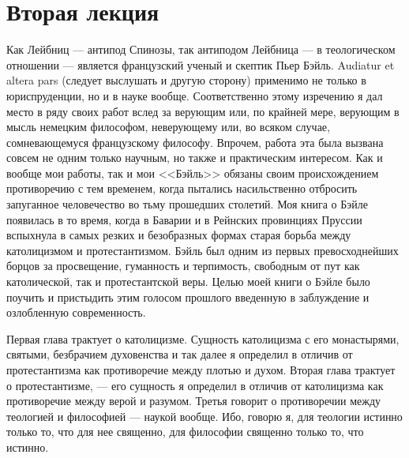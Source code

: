 \documentclass[12pt]{article}
\begin{document}
{}
\section*{Вторая лекция}

Как Лейбниц --- антипод Спинозы, так антиподом Лейбница --- в теологическом отношении --- является французский ученый и скептик Пьер Бэйль. Audiatur et altera pars (следует выслушать и другую сторону) применимо не только в юриспруденции, но и в науке вообще. Соответственно этому изречению я дал место в ряду своих работ вслед за верующим или, по крайней мере, верующим в мысль немецким философом, неверующему или, во всяком случае, сомневающемуся французскому философу. Впрочем, работа эта была вызвана совсем не одним только научным, но также и практическим интересом. Как и вообще мои работы, так и мои <<Бэйль>> обязаны своим происхождением противоречию с тем временем, когда пытались насильственно отбросить запуганное человечество во тьму прошедших столетий. Моя книга о Бэйле появилась в то время, когда в Баварии и в Рейнских провинциях Пруссии вспыхнула в самых резких и безобразных формах старая борьба между католицизмом и протестантизмом. Бэйль был одним из первых превосходнейших борцов за просвещение, гуманность и терпимость, свободным от пут как католической, так и протестантской веры. Целью моей книги о Бэйле было поучить и пристыдить этим голосом прошлого введенную в заблуждение и озлобленную современность. 

Первая глава трактует о католицизме. Сущность католицизма с его монастырями, святыми, безбрачием духовенства и так далее я определил в отличив от протестантизма как противоречие между плотью и духом. Вторая глава трактует о протестантизме, --- его сущность я определил в отличив от католицизма как противоречие между верой и разумом. Третья говорит о противоречии между теологией и философией --- наукой вообще. Ибо, говорю я, для теологии истинно только то, что для нее священно, для философии священно только то, что истинно. 
\end{document}
